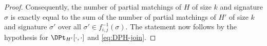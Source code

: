 \begin{proof}
    Consequently, the number of partial matchings of $H$ of size $k$ and signature $\sigma$
    is exactly equal to the sum of the number of partial matchings of $H'$ of size $k$ and signature $\sigma'$
    over all $\sigma' \in f^{-1}_{i,j}(\sigma)$.
    The statement now follows by the hypothesis for $\DPt_{H'}[\cdot,\cdot]$ and \cref{eq:DPH-join}.
\end{proof}

